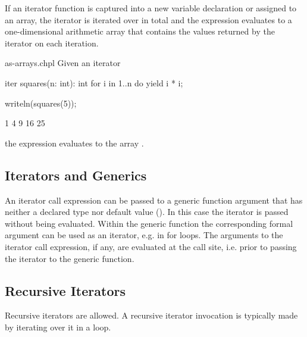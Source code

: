 If an iterator function is captured into a new variable declaration or
assigned to an array, the iterator is iterated over in total and the
expression evaluates to a one-dimensional arithmetic array that
contains the values returned by the iterator on each iteration.
\begin{chapelexample}{as-arrays.chpl}
Given an iterator
\begin{chapel}
iter squares(n: int): int {
  for i in 1..n do
    yield i * i;
}
\end{chapel}
\begin{chapelpost}
writeln(squares(5));
\end{chapelpost}
\begin{chapeloutput}
1 4 9 16 25
\end{chapeloutput}
the expression  evaluates to the array .
\end{chapelexample}

\subsection{Iterators and Generics}
\label{Iterators_and_Generics}

An iterator call expression can be passed to a generic function argument that
has neither a declared type nor default value
().
In this case the iterator is passed without being evaluated.
Within the generic function the corresponding formal argument
can be used as an iterator, e.g. in for loops.
The arguments to the iterator call expression, if any, are evaluated
at the call site, i.e. prior to passing the iterator to the generic function.

\subsection{Recursive Iterators}
\label{Recursive_Iterators}

Recursive iterators are allowed. A recursive iterator invocation is
typically made by iterating over it in a loop.


